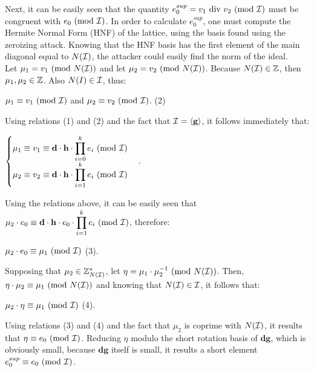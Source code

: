 Next, it can be easily seen that the quantity $e_0^{sup} = v_1 \text{ div } v_2\text{ (mod }\mathcal{I})$ must be congruent with $e_0 \text{ (mod }\mathcal{I})$. In order to calculate $e_0^{sup}$, one must compute the Hermite Normal Form (HNF) of the lattice, using the basis found using the zeroizing attack. Knowing that the HNF basis has the first element of the main diagonal equal to $N(\mathcal{I})$, the attacker could easily find the norm of the ideal.\\

Let $\mu_1 = v_1 \text{ (mod }N(\mathcal{I}))$ and let $\mu_2 = v_2 \text{ (mod }N(\mathcal{I}))$. Because $N(\mathcal{I}) \in {\mathbb Z}$, then $\mu_1, \mu_2 \in {\mathbb Z}$. Also $N(I) \in \mathcal{I}$, thus:
\begin{center}
 $\mu_1 \equiv v_1 \text{ (mod }\mathcal{I}) $ and $\mu_2 \equiv v_2 \text{ (mod }\mathcal{I})$. (2)
 \end{center}

Using relations (1) and (2) and the fact that $\mathcal{I} = \langle \textbf{g} \rangle$, it follows immediately that: 

\begin{center}
	$
	\begin{cases}
	\mu_1 \equiv v_1 \equiv \textbf{d} \cdot \textbf{h} \cdot \displaystyle{\prod_{i = 0}^{k} e_i}  \text{ (mod }\mathcal{I})  \\
	\mu_2 \equiv v_2 \equiv \textbf{d} \cdot \textbf{h} \cdot \displaystyle{\prod_{i = 1}^{k} e_i}  \text{ (mod }\mathcal{I})
	\end{cases}.
	$
\end{center}

Using the relations above, it can be easily seen that $\mu_2 \cdot e_0 \equiv \textbf{d} \cdot \textbf{h} \cdot e_0 \cdot \displaystyle{\prod_{i = 1}^{k} e_i}  \text{ (mod }\mathcal{I})$, therefore:

\begin{center}
	$\mu_2 \cdot e_0 \equiv \mu_1 \text{ (mod }\mathcal{I}) $ (3).
\end{center}

Supposing that $\mu_2 \in {\mathbb Z}_{N(\mathcal{I})}^*$, let $\eta = \mu_1 \cdot \mu_2^{-1} \text{ (mod }N(\mathcal{I}))$. Then, $\eta \cdot \mu_2 \equiv \mu_1 \text{ (mod }N(\mathcal{I}))$ and knowing that $N(\mathcal{I}) \in \mathcal{I}$, it follows that: 
\begin{center}
	$\mu_2 \cdot \eta \equiv \mu_1 \text{ (mod }\mathcal{I})$ (4).
\end{center}

Using relations (3) and (4) and the fact that $\mu_2$ is coprime with $N(\mathcal{I})$, it results that $\eta \equiv e_0 \text{ (mod }\mathcal{I})$. Reducing $\eta$ modulo the short rotation basis of $\textbf{dg}$, which is obviously small, because $\textbf{dg}$ itself is small, it results a short element $e_0^{sup} \equiv e_0 \text{ (mod }\mathcal{I})$. \\

